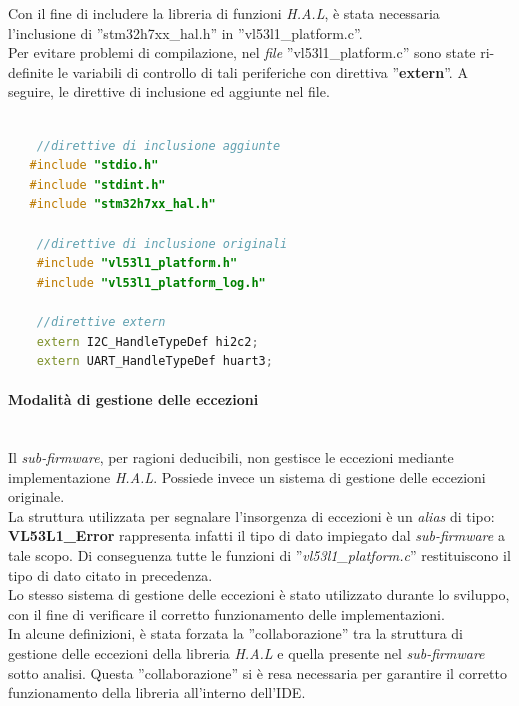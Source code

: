 Con il fine di includere la libreria di funzioni \textit{H.A.L}, è stata necessaria l'inclusione di ''stm32h7xx\_hal.h'' in ''vl53l1\_platform.c''.\\
Per evitare problemi di compilazione, nel \textit{file} ''vl53l1\_platform.c'' sono state ri-definite le variabili di controllo di tali periferiche con direttiva ''\textbf{extern}''.
A seguire, le direttive di inclusione ed  aggiunte nel file.\\
\begin{lstlisting}[language = Cpp, caption={\footnotesize \textit{path} delle direttive di inclusione di \textit{vl53l1\_platform.c}, in aggiunta la ridefinizione delle variabili di gestione della comunicazione}]

    //direttive di inclusione aggiunte
   #include "stdio.h"
   #include "stdint.h"
   #include "stm32h7xx_hal.h"
    
    //direttive di inclusione originali
    #include "vl53l1_platform.h"
    #include "vl53l1_platform_log.h"

    //direttive extern
    extern I2C_HandleTypeDef hi2c2;
    extern UART_HandleTypeDef huart3;

\end{lstlisting}


\paragraph{Modalità di gestione delle eccezioni}\mbox{}\\
Il \textit{sub-firmware}, per ragioni deducibili, non gestisce le eccezioni mediante implementazione \textit{H.A.L}.
Possiede invece un sistema di gestione delle eccezioni originale.\\
La struttura utilizzata per segnalare l'insorgenza di eccezioni è un \textit{alias} di tipo: \textbf{VL53L1\_Error} rappresenta infatti
il tipo di dato impiegato dal \textit{sub-firmware} a tale scopo. Di conseguenza tutte le funzioni di ''\textit{vl53l1\_platform.c}'' restituiscono il 
tipo di dato citato in precedenza.\\
Lo stesso sistema di gestione delle eccezioni è stato utilizzato durante lo sviluppo, con il fine di verificare il corretto funzionamento delle implementazioni.\\
In alcune definizioni, è stata forzata la ''collaborazione'' tra la struttura di gestione delle eccezioni della libreria \textit{H.A.L} e quella presente nel \textit{sub-firmware}
sotto analisi. Questa ''collaborazione'' si è resa necessaria per garantire il corretto funzionamento della libreria all'interno dell'IDE.\\

